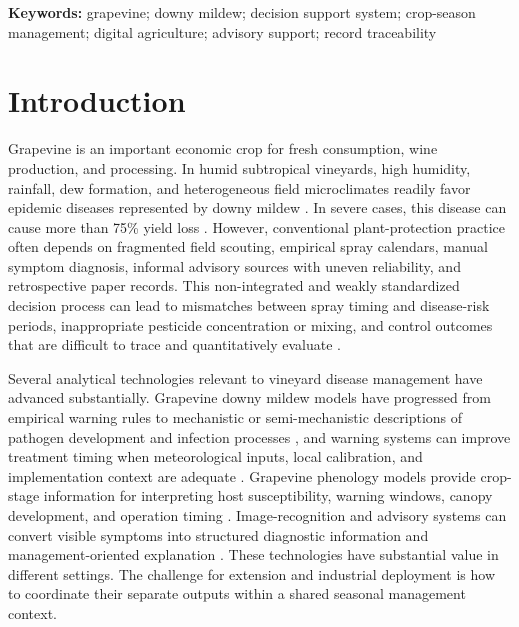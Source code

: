 \documentclass[12pt]{article}
\begin{document}
\noindent\textbf{Keywords:} grapevine; downy mildew; decision support system; crop-season management; digital agriculture; advisory support; record traceability

\section{Introduction}\label{introduction}

Grapevine is an important economic crop for fresh consumption, wine production, and processing. In humid subtropical vineyards, high humidity, rainfall, dew formation, and heterogeneous field microclimates readily favor epidemic diseases represented by downy mildew \citep{gesslerPlasmoparaViticolaReview2011,yuEffectsRainShelter2017,yuComparisonThreeTypes2022,pengAdvancesUnderstandingGrapevine2024}. In severe cases, this disease can cause more than 75\% yield loss \citep{koledenkovaPlasmoparaViticolaCausal2022,pengAdvancesUnderstandingGrapevine2024}. However, conventional plant-protection practice often depends on fragmented field scouting, empirical spray calendars, manual symptom diagnosis, informal advisory sources with uneven reliability, and retrospective paper records. This non-integrated and weakly standardized decision process can lead to mismatches between spray timing and disease-risk periods, inappropriate pesticide concentration or mixing, and control outcomes that are difficult to trace and quantitatively evaluate \citep{pertotCriticalReviewPlant2017,rossiAddressingImplementationProblem2014,oliverFungicideUsePatterns2023,wiseSprayerTypeWater2010}.

Several analytical technologies relevant to vineyard disease management have advanced substantially. Grapevine downy mildew models have progressed from empirical warning rules to mechanistic or semi-mechanistic descriptions of pathogen development and infection processes \citep{orlandiniPLASMOSimulationModel1993,parkDMCASTPredictionModel1997,caffiMechanisticModelSimulating2011}, and warning systems can improve treatment timing when meteorological inputs, local calibration, and implementation context are adequate \citep{caffiEvaluationWarningSystem2010,caffiFungicideModelsAre2018,carisseDevelopmentGrapeDowny2016}. Grapevine phenology models provide crop-stage information for interpreting host susceptibility, warning windows, canopy development, and operation timing \citep{caffarraIncreasingRobustnessPhenological2010,parkerGeneralPhenologicalModel2011,garciadecortazar-atauriGrapevinePhenologyFrance2017,wangAssessingGrapevinePhenological2020}. Image-recognition and advisory systems can convert visible symptoms into structured diagnostic information and management-oriented explanation \citep{yanAFMYOLOv8sAccurateFast2024,yanCDIPChatGLM3DualmodelApproach2025,shafayEndtoendVisionLanguage2026,raiAdvancingSitespecificDisease2026}. These technologies have substantial value in different settings. The challenge for extension and industrial deployment is how to coordinate their separate outputs within a shared seasonal management context.
\end{document}
